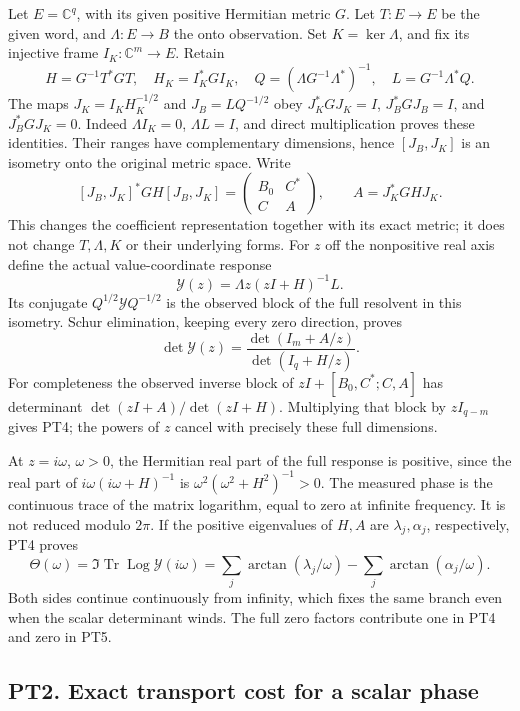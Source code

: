 \documentclass[10pt]{article}
\DeclareMathOperator{\Log}{Log}
\begin{document}
Let \(E=\mathbb C^q\), with its given positive Hermitian metric \(G\). Let \(T:E\to E\) be the given word, and \(\Lambda:E\to B\) the onto observation. Set \(K=\ker\Lambda\), and fix its injective frame \(I_K:\mathbb C^m\to E\). Retain \[
 H=G^{-1}T^*GT,\quad H_K=I_K^*GI_K,\quad
 Q=(\Lambda G^{-1}\Lambda^*)^{-1},\quad L=G^{-1}\Lambda^*Q.
 \tag{PT1}
\] The maps \(J_K=I_KH_K^{-1/2}\) and \(J_B=LQ^{-1/2}\) obey \(J_K^*GJ_K=I\), \(J_B^*GJ_B=I\), and \(J_B^*GJ_K=0\). Indeed \(\Lambda I_K=0\), \(\Lambda L=I\), and direct multiplication proves these identities. Their ranges have complementary dimensions, hence \([J_B,J_K]\) is an isometry onto the original metric space. Write \[
 [J_B,J_K]^*GH[J_B,J_K]=
 \begin{pmatrix}B_0&C^*\\C&A\end{pmatrix},\qquad A=J_K^*G HJ_K.
 \tag{PT2}
\] This changes the coefficient representation together with its exact metric; it does not change \(T,\Lambda,K\) or their underlying forms. For \(z\) off the nonpositive real axis define the actual value-coordinate response \[
 \mathscr Y(z)=\Lambda z(zI+H)^{-1}L.
 \tag{PT3}
\] Its conjugate \(Q^{1/2}\mathscr YQ^{-1/2}\) is the observed block of the full resolvent in this isometry. Schur elimination, keeping every zero direction, proves \[
 \det\mathscr Y(z)=\frac{\det(I_m+A/z)}{\det(I_q+H/z)}.
 \tag{PT4}
\] For completeness the observed inverse block of \(zI+[B_0,C^*;C,A]\) has determinant \(\det(zI+A)/\det(zI+H)\). Multiplying that block by \(zI_{q-m}\) gives PT4; the powers of \(z\) cancel with precisely these full dimensions.

At \(z=i\omega\), \(\omega>0\), the Hermitian real part of the full response is positive, since the real part of \(i\omega(i\omega+H)^{-1}\) is \(\omega^2(\omega^2+H^2)^{-1}>0\). The measured phase is the continuous trace of the matrix logarithm, equal to zero at infinite frequency. It is not reduced modulo \(2\pi\). If the positive eigenvalues of \(H,A\) are \(\lambda_j,\alpha_j\), respectively, PT4 proves \[
 \Theta(\omega)=\Im\operatorname{Tr}\Log\mathscr Y(i\omega)
 =\sum_j\arctan(\lambda_j/\omega)-\sum_j\arctan(\alpha_j/\omega).
 \tag{PT5}
\] Both sides continue continuously from infinity, which fixes the same branch even when the scalar determinant winds. The full zero factors contribute one in PT4 and zero in PT5.

\subsection{PT2. Exact transport cost for a scalar phase}\label{pt2.-exact-transport-cost-for-a-scalar-phase}
\end{document}
